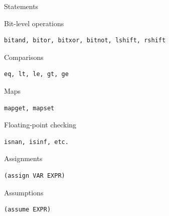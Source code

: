\documentclass[aspectratio=1610,10.5pt]{beamer} %
\begin{document}
\begin{frame}[fragile]{Statements}
    \begin{block}{Bit-level operations}
            \begin{verbatim}
bitand, bitor, bitxor, bitnot, lshift, rshift
            \end{verbatim}
    \end{block}
    \begin{block}{Comparisons}
            \begin{verbatim}
eq, lt, le, gt, ge
            \end{verbatim}
    \end{block}
    \begin{block}{Maps}
            \begin{verbatim}
mapget, mapset
            \end{verbatim}
    \end{block}
    \begin{block}{Floating-point checking}
            \begin{verbatim}
isnan, isinf, etc.
            \end{verbatim}
    \end{block}
    \begin{block}{Assignments}
            \begin{verbatim}
(assign VAR EXPR)
            \end{verbatim}
    \end{block}
    \begin{block}{Assumptions}
            \begin{verbatim}
(assume EXPR)
            \end{verbatim}
    \end{block}
\end{frame}
\end{document}

